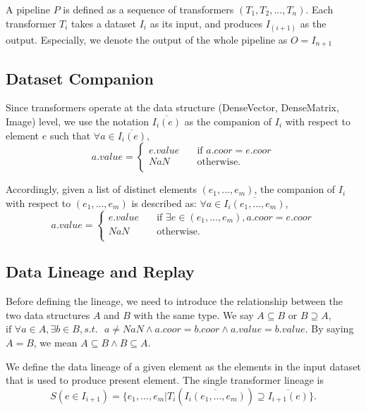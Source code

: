 \documentclass{sig-alternate}
\begin{document}
A pipeline $P$ is defined as a sequence of transformers $(T_1, T_2, ..., T_n)$. 
Each transformer $T_i$ takes a dataset $I_i$ as its input, and produces $I_{(i+1)}$ as the output. 
Especially, we denote the output of the whole pipeline as $O = I_{n+1}$

\subsection{Dataset Companion}
Since transformers operate at the data structure (DenseVector, DenseMatrix, Image) level, we use the notation
$\overline{I_i(e)}$ as the companion of $I_i$ with respect to element $e$ such that $\forall a \in \overline{I_i(e)}$,
\[ a.value =
  \begin{cases}
    e.value       & \quad \text{if } a.coor = e.coor\\
    NaN  & \quad \text{otherwise}. \\
  \end{cases}
\]

Accordingly, given a list of distinct elements $(e_1, ..., e_m)$, the companion of $I_i$ with respect to $(e_1, ..., e_m)$ is
described as: $\forall a \in \overline{I_i(e_1, ..., e_m)}$, 
\[ a.value =
  \begin{cases}
    e.value       & \quad \text{if } \exists e \in (e_1,...,e_m), a.coor = e.coor\\
    NaN  & \quad \text{otherwise}. \\
  \end{cases}
\]


\subsection{Data Lineage and Replay}
Before defining the lineage, we need to introduce the relationship between the two data structures $A$ and $B$ with the same type.
We say $A \subseteq B \text{ or } B \supseteq A$, $\text{if }\forall a \in A, \exists b \in B, s.t.\text{ } a \neq NaN \land a.coor = b.coor \land a.value = b.value$.
By saying $A = B$, we mean $A \subseteq B \land B \subseteq A$.

We define the data lineage of a given element as the elements in the input dataset that is used to produce present element.
The single transformer lineage is
\begin{equation}
S(e \in I_{i+1}) = \{e_1, ..., e_m | T_i(\overline{I_i(e_1, ..., e_m)}) \supseteq \overline{I_{i+1}(e)}\}.
\label{equa:SingleLineage}
\end{equation}
\end{document}
